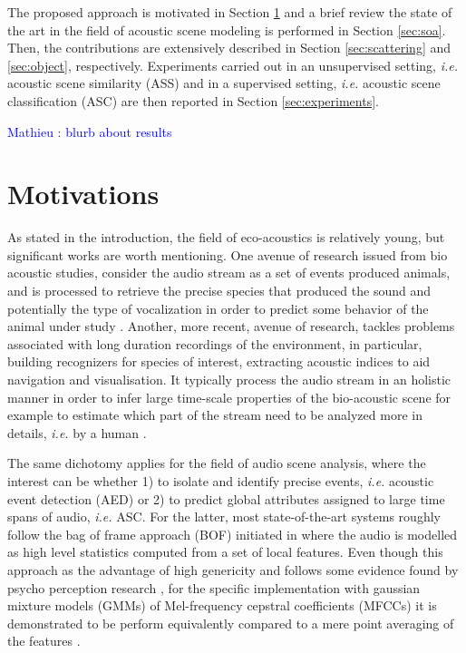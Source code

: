\documentclass[journal]{IEEEtran}
\newcommand{\ml}[1]{\textcolor{blue}{ Mathieu : #1}}
\begin{document}
The proposed approach is motivated in Section \ref{sec:motivations}  and a brief review the state of the art in the field of acoustic scene modeling is performed in Section \ref{sec:soa}. Then, the contributions are extensively described in Section \ref{sec:scattering} and \ref{sec:object}, respectively. Experiments carried out in an unsupervised setting, \textit{i.e.} acoustic scene similarity (ASS) and in a supervised setting, \textit{i.e.}  acoustic scene classification (ASC) are then reported in Section \ref{sec:experiments}.

\ml{blurb about results}

\section{Motivations} \label{sec:motivations}

As stated in the introduction, the field of eco-acoustics is relatively young, but significant works are worth mentioning. One avenue of research issued from bio acoustic studies, consider the audio stream as a set of events produced animals, and is processed to retrieve the precise species that produced the sound and potentially the type of vocalization in order to predict some behavior of the animal under study \cite{au2008principles, stowell2014large}. Another, more recent, avenue of research, tackles problems associated with long duration recordings of the environment, in particular, building recognizers for species of interest, extracting acoustic indices to aid navigation and visualisation. It typically process the audio stream in an holistic manner in order to infer large time-scale properties of the bio-acoustic scene for example to estimate which part of the stream need to be analyzed more in details, \textit{i.e.} by a human \cite{rosenstock2002landbird,diefenbach2007incorporating}.

The same dichotomy applies for the field of audio scene analysis, where the interest can be whether 1) to isolate and identify precise events, \textit{i.e.} acoustic event detection (AED) or 2) to predict global attributes assigned to large time spans of audio, \textit{i.e.} ASC. For the latter, most state-of-the-art systems roughly follow the bag of frame approach (BOF) initiated in \cite{aucouturier2007bag} where the audio is modelled as high level statistics computed from a set of local features. Even though this approach as the advantage of high genericity and follows some evidence found by psycho perception research \cite{mcdermott2013summary}, for the specific implementation with gaussian mixture models (GMMs) of Mel-frequency cepstral coefficients (MFCCs) it is demonstrated to be perform equivalently compared to a mere point averaging of the features  \cite{lagrange:hal-01082501}.
\end{document}
